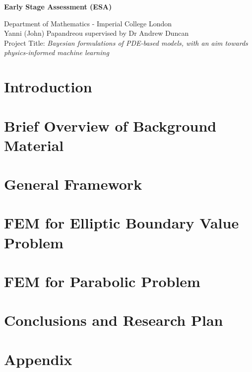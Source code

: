 \documentclass{article}
\theoremstyle{definition}
\theoremstyle{remark}
\begin{document}
    \begin{center}
        \vspace*{0.5cm}

        \LARGE
        \textbf{Early Stage Assessment (ESA)}

        \vspace{0.5cm}
        \large
        Department of Mathematics - Imperial College London \\
        Yanni (John) Papandreou supervised by Dr Andrew Duncan \\
        Project Title: \textit{Bayesian formulations of PDE-based models, with an aim towards physics-informed machine learning}
    \end{center}

\setlength\parskip{10pt}
\setlength\parindent{20pt}

\section{Introduction}
\label{intro}


\section{Brief Overview of Background Material}
\label{lit_review}


\section{General Framework}
\label{general_framework}


\section{FEM for Elliptic Boundary Value Problem}
\label{elliptic_bv_prob}

\section{FEM for Parabolic Problem}
\label{parabolic_prob}

\section{Conclusions and Research Plan}
\label{conclusion}

\section{Appendix}
\label{appendix}


% 
\end{document}
